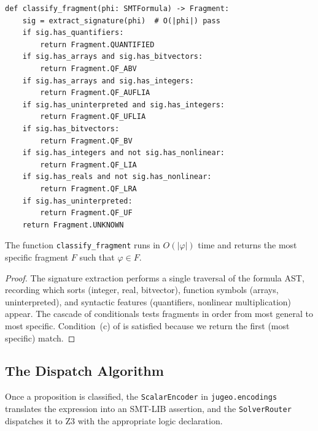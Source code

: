 \begin{lstlisting}[style=jugeo-python,
  caption={Fragment classification (simplified).},
  label={lst:classify}]
def classify_fragment(phi: SMTFormula) -> Fragment:
    sig = extract_signature(phi)  # O(|phi|) pass
    if sig.has_quantifiers:
        return Fragment.QUANTIFIED
    if sig.has_arrays and sig.has_bitvectors:
        return Fragment.QF_ABV
    if sig.has_arrays and sig.has_integers:
        return Fragment.QF_AUFLIA
    if sig.has_uninterpreted and sig.has_integers:
        return Fragment.QF_UFLIA
    if sig.has_bitvectors:
        return Fragment.QF_BV
    if sig.has_integers and not sig.has_nonlinear:
        return Fragment.QF_LIA
    if sig.has_reals and not sig.has_nonlinear:
        return Fragment.QF_LRA
    if sig.has_uninterpreted:
        return Fragment.QF_UF
    return Fragment.UNKNOWN
\end{lstlisting}

\begin{lemma}\label{lem:classify}
The function \texttt{classify\_fragment} runs in $O(|\varphi|)$ time
and returns the most specific fragment $F$ such that $\varphi \in F$.
\end{lemma}

\begin{proof}
The signature extraction performs a single traversal of the formula
AST, recording which sorts (integer, real, bitvector), function
symbols (arrays, uninterpreted), and syntactic features (quantifiers,
nonlinear multiplication) appear.  The cascade of conditionals tests
fragments in order from most general to most specific.
Condition~(c) of  is satisfied because we
return the first (most specific) match.
\end{proof}

\subsection{The Dispatch Algorithm}\label{sec:dispatch-algo}

Once a proposition is classified, the \texttt{ScalarEncoder} in
\texttt{jugeo.encodings} translates the \Python{} expression into an
SMT-LIB assertion, and the \texttt{SolverRouter} dispatches it to Z3
with the appropriate logic declaration.

